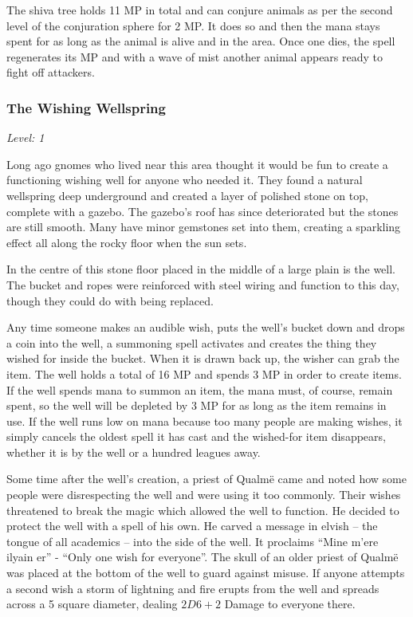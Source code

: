 The shiva tree holds 11 MP in total and can conjure animals as per the second level of the conjuration sphere for 2 MP.  It does so and then the mana stays spent for as long as the animal is alive and in the area.  Once one dies, the spell regenerates its MP and with a wave of mist another animal appears ready to fight off attackers.

\subsubsection{The Wishing Wellspring}

\textit{Level: 1}

Long ago gnomes who lived near this area thought it would be fun to create a functioning wishing well for anyone who needed it.  They found a natural wellspring deep underground and created a layer of polished stone on top, complete with a gazebo.  The gazebo's roof has since deteriorated but the stones are still smooth.  Many have minor gemstones set into them, creating a sparkling effect all along the rocky floor when the sun sets.

In the centre of this stone floor placed in the middle of a large plain is the well.  The bucket and ropes were reinforced with steel wiring and function to this day, though they could do with being replaced.

Any time someone makes an audible wish, puts the well's bucket down and drops a coin into the well, a summoning spell activates and creates the thing they wished for inside the bucket.  When it is drawn back up, the wisher can grab the item.  The well holds a total of 16 MP and spends 3 MP in order to create items.  If the well spends mana to summon an item, the mana must, of course, remain spent, so the well will be depleted by 3 MP for as long as the item remains in use.  If the well runs low on mana because too many people are making wishes, it simply cancels the oldest spell it has cast and the wished-for item disappears, whether it is by the well or a hundred leagues away.

Some time after the well's creation, a priest of Qualm\"{e} came and noted how some people were disrespecting the well and were using it too commonly.  Their wishes threatened to break the magic which allowed the well to function.  He decided to protect the well with a spell of his own.  He carved a message in elvish -- the tongue of all academics -- into the side of the well.  It proclaims ``Mine m'{e}re ilyain er'' - ``Only one wish for everyone''.  The skull of an older priest of Qualm\"{e} was placed at the bottom of the well to guard against misuse.  If anyone attempts a second wish a storm of lightning and fire erupts from the well and spreads across a 5 square diameter, dealing $2D6+2$ Damage to everyone there.

